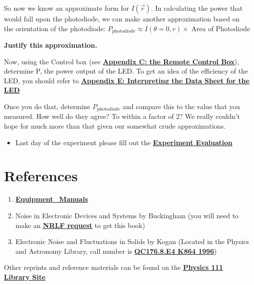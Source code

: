 \documentclass{../lab}
\begin{document}
So now we know an approximate form for $I(\vec{r})$. In calculating the power that would fall upon the photodiode, we can make another approximation based on the orientation of the photodiode: $P_\text{photodiode} \approx I(\theta = 0, r) \times$ Area of Photodiode

\textbf{Justify this approximation.}

Now, using the Control box (see \href{http://dev-physicsadv.pantheon.berkeley.edu/node/98}{\textbf{Appendix C: the Remote Control Box}}), determine P, the power output of the LED. To get an idea of the efficiency of the LED, you should refer to \href{http://dev-physicsadv.pantheon.berkeley.edu/node/100}{\textbf{Appendix E: Interpreting the Data Sheet for the LED}}

Once you do that, determine $P_\text{photodiode}$ and compare this to the value that you measured. How well do they agree? To within a factor of 2? We really couldn't hope for much more than that given our somewhat crude approximations.

\begin{itemize}
    \item Last day of the experiment please fill out the \href{\ExperimentEvaluation}{\textbf{Experiment Evaluation}}

\end{itemize}

\section{References}
\label{sec:References}

\begin{enumerate}
    \item \href{http://physics111.lib.berkeley.edu/Physics111/Equipment\_Manuals/LLS/indexequipLLS.html}{\textbf{Equipment\_Manuals}}

    \item Noise in Electronic Devices and Systems by Buckingham (you will need to make an \href{http://oskicat.berkeley.edu/screens/help\_borrowing.html#nrlfrequest}{\textbf{NRLF request}} to get this book)

    \item Electronic Noise and Fluctuations in Solids by Kogan (Located in the Physics and Astronomy Library, call number is \href{http://oskicat.berkeley.edu/search\~S1?/cQC176.8.E4+K864+1996/cqc++176.8+e4+k864+1996/-3,-1,,B/browse}{\textbf{QC176.8.E4 K864 1996}})

\end{enumerate}

\noindent Other reprints and reference materials can be found on the \href{http://physics111.lib.berkeley.edu/Physics111/Reprints/LLS/LLS\_index.html}{\textbf{Physics 111 Library Site}}
\end{document}
